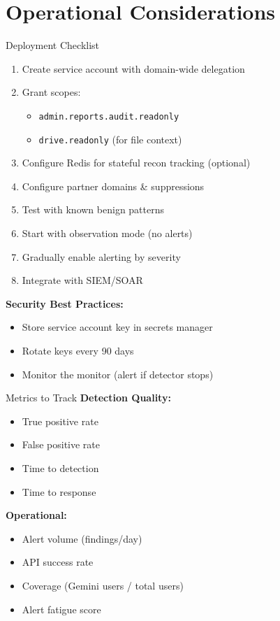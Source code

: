 \documentclass[aspectratio=169]{beamer}
\begin{document}
\section{Operational Considerations}

\begin{frame}{Deployment Checklist}
\begin{enumerate}
    \item Create service account with domain-wide delegation
    \item Grant scopes:
        \begin{itemize}
            \item \texttt{admin.reports.audit.readonly}
            \item \texttt{drive.readonly} (for file context)
        \end{itemize}
    \item Configure Redis for stateful recon tracking (optional)
    \item Configure partner domains \& suppressions
    \item Test with known benign patterns
    \item Start with observation mode (no alerts)
    \item Gradually enable alerting by severity
    \item Integrate with SIEM/SOAR
\end{enumerate}

\vspace{1em}

\textbf{Security Best Practices:}
\begin{itemize}
    \item Store service account key in secrets manager
    \item Rotate keys every 90 days
    \item Monitor the monitor (alert if detector stops)
\end{itemize}
\end{frame}

\begin{frame}{Metrics to Track}
\textbf{Detection Quality:}
\begin{itemize}
    \item True positive rate
    \item False positive rate
    \item Time to detection
    \item Time to response
\end{itemize}

\vspace{1em}

\textbf{Operational:}
\begin{itemize}
    \item Alert volume (findings/day)
    \item API success rate
    \item Coverage (Gemini users / total users)
    \item Alert fatigue score
\end{itemize}
\end{frame}
\end{document}
